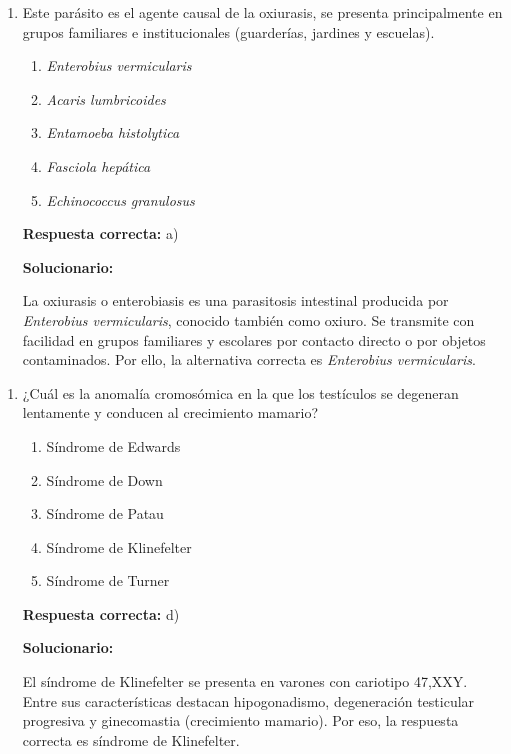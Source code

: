 \begin{enumerate}[resume]
	
	\item Este parásito es el agente causal de la oxiurasis, se presenta principalmente en grupos familiares e institucionales (guarderías, jardines y escuelas).
	
	\begin{enumerate}[label=\alph*)]
		\item \textit{Enterobius vermicularis}
		\item \textit{Acaris lumbricoides}
		\item \textit{Entamoeba histolytica}
		\item \textit{Fasciola hepática}
		\item \textit{Echinococcus granulosus}
	\end{enumerate}
	
	\textbf{Respuesta correcta:} a)
	
	\vspace{2mm}
	\textbf{Solucionario:}
	
	La oxiurasis o enterobiasis es una parasitosis intestinal producida por \textit{Enterobius vermicularis}, conocido también como oxiuro. Se transmite con facilidad en grupos familiares y escolares por contacto directo o por objetos contaminados. Por ello, la alternativa correcta es \textit{Enterobius vermicularis}.
	
\end{enumerate}


\begin{enumerate}[resume]
	
	\item ¿Cuál es la anomalía cromosómica en la que los testículos se degeneran lentamente y conducen al crecimiento mamario?
	
	\begin{enumerate}[label=\alph*)]
		\item Síndrome de Edwards
		\item Síndrome de Down
		\item Síndrome de Patau 
		\item Síndrome de Klinefelter
		\item Síndrome de Turner
	\end{enumerate}
	
	\textbf{Respuesta correcta:} d)
	
	\vspace{2mm}
	\textbf{Solucionario:}
	
	El síndrome de Klinefelter se presenta en varones con cariotipo 47,XXY. Entre sus características destacan hipogonadismo, degeneración testicular progresiva y ginecomastia (crecimiento mamario). Por eso, la respuesta correcta es síndrome de Klinefelter.
	
\end{enumerate}

